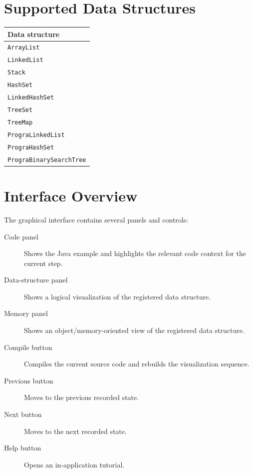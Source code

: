 \documentclass[12pt,a4paper]{article}
\begin{document}
\section{Supported Data Structures}
\begin{center}
    \begin{tabular}{p{}}
        \toprule
        \textbf{Data structure} \\
        \midrule
        \texttt{ArrayList} \\
        \texttt{LinkedList} \\
        \texttt{Stack} \\
        \texttt{HashSet} \\
        \texttt{LinkedHashSet} \\
        \texttt{TreeSet} \\
        \texttt{TreeMap} \\
        \texttt{PrograLinkedList} \\
        \texttt{PrograHashSet} \\
        \texttt{PrograBinarySearchTree} \\
        \bottomrule
    \end{tabular}
\end{center}

\section{Interface Overview}

The graphical interface contains several panels and controls:

\begin{description}
    \item[Code panel] Shows the Java example and highlights the relevant code context for the current step.
    \item[Data-structure panel] Shows a logical visualization of the registered data structure.
    \item[Memory panel] Shows an object/memory-oriented view of the registered data structure.
    \item[Compile button] Compiles the current source code and rebuilds the visualization sequence.
    \item[Previous button] Moves to the previous recorded state.
    \item[Next button] Moves to the next recorded state.
    \item[Help button] Opens an in-application tutorial.
\end{description}
\end{document}
